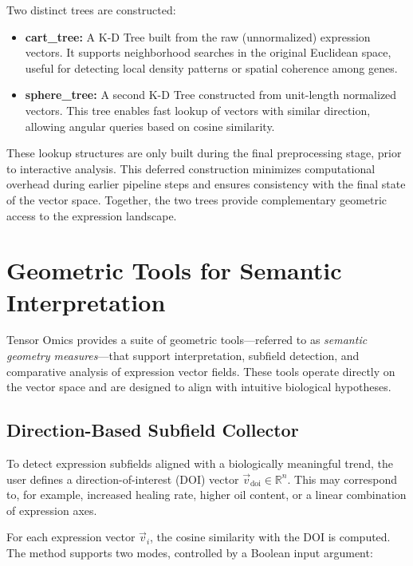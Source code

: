 \documentclass{article}
\begin{document}
Two distinct trees are constructed:

\begin{itemize}
    \item \textbf{cart\_tree:} A K-D Tree built from the raw (unnormalized) expression vectors. It supports neighborhood searches in the original Euclidean space, useful for detecting local density patterns or spatial coherence among genes.
    
    \item \textbf{sphere\_tree:} A second K-D Tree constructed from unit-length normalized vectors. This tree enables fast lookup of vectors with similar direction, allowing angular queries based on cosine similarity.
\end{itemize}

These lookup structures are only built during the final preprocessing stage, prior to interactive analysis. This deferred construction minimizes computational overhead during earlier pipeline steps and ensures consistency with the final state of the vector space. Together, the two trees provide complementary geometric access to the expression landscape.

\section{Geometric Tools for Semantic Interpretation}
\label{sec:geometric_tools}

Tensor Omics provides a suite of geometric tools—referred to as \textit{semantic geometry measures}—that support interpretation, subfield detection, and comparative analysis of expression vector fields. These tools operate directly on the vector space and are designed to align with intuitive biological hypotheses.

\subsection{Direction-Based Subfield Collector}
\label{sec:directional_collector}

To detect expression subfields aligned with a biologically meaningful trend, the user defines a direction-of-interest (DOI) vector \( \vec{v}_{\text{doi}} \in \mathbb{R}^n \). This may correspond to, for example, increased healing rate, higher oil content, or a linear combination of expression axes.

For each expression vector \( \vec{v}_i \), the cosine similarity with the DOI is computed. The method supports two modes, controlled by a Boolean input argument:
\end{document}
